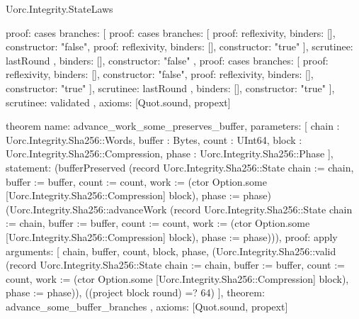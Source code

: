 \begin{lexlean}{Uorc.Integrity.StateLaws}
\begin{semanticmodule}
{  proof: cases{
    branches: [
      {
        proof: cases{
          branches: [
            {proof: reflexivity{}, binders: [], constructor: "false"},
            {proof: reflexivity{}, binders: [], constructor: "true"}
          ],
          scrutinee: lastRound
        },
        binders: [],
        constructor: "false"
      },
      {
        proof: cases{
          branches: [
            {proof: reflexivity{}, binders: [], constructor: "false"},
            {proof: reflexivity{}, binders: [], constructor: "true"}
          ],
          scrutinee: lastRound
        },
        binders: [],
        constructor: "true"
      }
    ],
    scrutinee: validated
  },
  axioms: [Quot.sound, propext]
}

theorem{
  name: advance_work_some_preserves_buffer,
  parameters: [
    chain : Uorc.Integrity.Sha256::Words,
    buffer : Bytes,
    count : UInt64,
    block : Uorc.Integrity.Sha256::Compression,
    phase : Uorc.Integrity.Sha256::Phase
  ],
  statement: (bufferPreserved (record Uorc.Integrity.Sha256::State {chain := chain, buffer := buffer, count := count, work := (ctor Option.some [Uorc.Integrity.Sha256::Compression] block), phase := phase}) (Uorc.Integrity.Sha256::advanceWork (record Uorc.Integrity.Sha256::State {chain := chain, buffer := buffer, count := count, work := (ctor Option.some [Uorc.Integrity.Sha256::Compression] block), phase := phase}))),
  proof: apply{
    arguments: [
      chain,
      buffer,
      count,
      block,
      phase,
      (Uorc.Integrity.Sha256::valid (record Uorc.Integrity.Sha256::State {chain := chain, buffer := buffer, count := count, work := (ctor Option.some [Uorc.Integrity.Sha256::Compression] block), phase := phase})),
      ((project block round) =? 64)
    ],
    theorem: advance_some_buffer_branches
  },
  axioms: [Quot.sound, propext]
}


\end{semanticmodule}
\end{lexlean}
